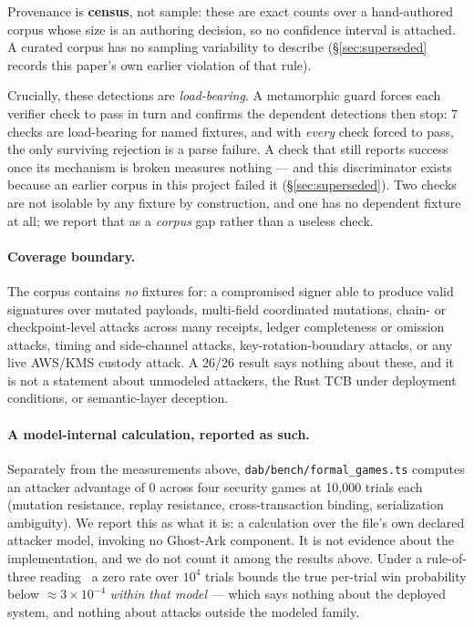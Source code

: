 \documentclass[10pt,twocolumn,letterpaper]{article}
\newcommand{\evthreeintrinsic}{26/26}   %
\newcommand{\evfourloadbearing}{7}      %
\newcommand{\benchtrials}{10{,}000}
\newcommand{\globaladvantage}{0}
\begin{document}
Provenance is \textbf{census}, not sample: these are exact counts over a
hand-authored corpus whose size is an authoring decision, so no confidence
interval is attached. A curated corpus has no sampling variability to
describe (\S\ref{sec:superseded} records this paper's own earlier violation
of that rule).

Crucially, these detections are \emph{load-bearing}. A metamorphic guard
forces each verifier check to pass in turn and confirms the dependent
detections then stop: \evfourloadbearing{} checks are load-bearing for named
fixtures, and with \emph{every} check forced to pass, the only surviving
rejection is a parse failure. A check that still reports success once its
mechanism is broken measures nothing --- and this discriminator exists
because an earlier corpus in this project failed it
(\S\ref{sec:superseded}). Two checks are not isolable by any fixture by
construction, and one has no dependent fixture at all; we report that as a
\emph{corpus} gap rather than a useless check.

\paragraph{Coverage boundary.} The corpus contains \emph{no} fixtures for: a
compromised signer able to produce valid signatures over mutated payloads,
multi-field coordinated mutations, chain- or checkpoint-level attacks across
many receipts, ledger completeness or omission attacks, timing and
side-channel attacks, key-rotation-boundary attacks, or any live AWS/KMS
custody attack. A \evthreeintrinsic{} result says nothing about these, and it
is not a statement about unmodeled attackers, the Rust TCB under deployment
conditions, or semantic-layer deception.

\paragraph{A model-internal calculation, reported as such.}
Separately from the measurements above, \texttt{dab/bench/formal\_games.ts}
computes an attacker advantage of \globaladvantage{} across four security
games at \benchtrials{} trials each (mutation resistance, replay resistance,
cross-transaction binding, serialization ambiguity). We report this as what
it is: a calculation over the file's own declared attacker model, invoking no
Ghost-Ark component. It is not evidence about the implementation, and we do
not count it among the results above. Under a rule-of-three
reading~\cite{hanley1983rule} a zero rate over $10^4$ trials bounds the true
per-trial win probability below $\approx 3\times10^{-4}$ \emph{within that
model} --- which says nothing about the deployed system, and nothing about
attacks outside the modeled family.
\end{document}
